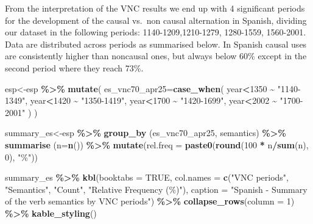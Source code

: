 \documentclass[
]{article}
\newenvironment{Shaded}{\begin{snugshade}}{\end{snugshade}}
\newcommand{\AttributeTok}[1]{\textcolor[rgb]{0.13,0.29,0.53}{#1}}
\newcommand{\ConstantTok}[1]{\textcolor[rgb]{0.56,0.35,0.01}{#1}}
\newcommand{\DecValTok}[1]{\textcolor[rgb]{0.00,0.00,0.81}{#1}}
\newcommand{\FunctionTok}[1]{\textcolor[rgb]{0.13,0.29,0.53}{\textbf{#1}}}
\newcommand{\NormalTok}[1]{#1}
\newcommand{\OtherTok}[1]{\textcolor[rgb]{0.56,0.35,0.01}{#1}}
\newcommand{\SpecialCharTok}[1]{\textcolor[rgb]{0.81,0.36,0.00}{\textbf{#1}}}
\newcommand{\StringTok}[1]{\textcolor[rgb]{0.31,0.60,0.02}{#1}}
\begin{document}
From the interpretation of the VNC results we end up with 4 significant
periods for the development of the causal vs.~non causal alternation in
Spanish, dividing our dataset in the following periods:
1140-1209,1210-1279, 1280-1559, 1560-2001. Data are distributed across
periods as summarised below. In Spanish causal uses are consistently
higher than noncausal ones, but always below 60\% except in the second
period where they reach 73\%.

\begin{Shaded}
\begin{Highlighting}[]
\NormalTok{esp}\OtherTok{\textless{}{-}}\NormalTok{esp }\SpecialCharTok{\%\textgreater{}\%} 
  \FunctionTok{mutate}\NormalTok{(}
    \AttributeTok{es\_vnc70\_apr25=}\FunctionTok{case\_when}\NormalTok{(}
\NormalTok{      year}\SpecialCharTok{\textless{}}\DecValTok{1350} \SpecialCharTok{\textasciitilde{}} \StringTok{"1140{-}1349"}\NormalTok{,}
\NormalTok{      year}\SpecialCharTok{\textless{}}\DecValTok{1420} \SpecialCharTok{\textasciitilde{}} \StringTok{"1350{-}1419"}\NormalTok{,}
\NormalTok{      year}\SpecialCharTok{\textless{}}\DecValTok{1700} \SpecialCharTok{\textasciitilde{}} \StringTok{"1420{-}1699"}\NormalTok{,}
\NormalTok{      year}\SpecialCharTok{\textless{}}\DecValTok{2002} \SpecialCharTok{\textasciitilde{}} \StringTok{"1700{-}2001"}
\NormalTok{    )}
\NormalTok{  )}

\NormalTok{summary\_es}\OtherTok{\textless{}{-}}\NormalTok{esp }\SpecialCharTok{\%\textgreater{}\%}
  \FunctionTok{group\_by}\NormalTok{ (es\_vnc70\_apr25, semantics) }\SpecialCharTok{\%\textgreater{}\%}
  \FunctionTok{summarise}\NormalTok{ (}\AttributeTok{n=}\FunctionTok{n}\NormalTok{()) }\SpecialCharTok{\%\textgreater{}\%}
  \FunctionTok{mutate}\NormalTok{(}\AttributeTok{rel.freq =} \FunctionTok{paste0}\NormalTok{(}\FunctionTok{round}\NormalTok{(}\DecValTok{100} \SpecialCharTok{*}\NormalTok{ n}\SpecialCharTok{/}\FunctionTok{sum}\NormalTok{(n), }\DecValTok{0}\NormalTok{), }\StringTok{"\%"}\NormalTok{))}

\NormalTok{summary\_es }\SpecialCharTok{\%\textgreater{}\%}  \FunctionTok{kbl}\NormalTok{(}\AttributeTok{booktabs =} \ConstantTok{TRUE}\NormalTok{, }\AttributeTok{col.names =} \FunctionTok{c}\NormalTok{(}\StringTok{"VNC periods"}\NormalTok{, }\StringTok{"Semantics"}\NormalTok{, }\StringTok{"Count"}\NormalTok{, }\StringTok{"Relative Frequency (\%)"}\NormalTok{), }\AttributeTok{caption =} \StringTok{"Spanish {-} Summary of the verb semantics by VNC periods"}\NormalTok{) }\SpecialCharTok{\%\textgreater{}\%}
   \FunctionTok{collapse\_rows}\NormalTok{(}\AttributeTok{column =} \DecValTok{1}\NormalTok{) }\SpecialCharTok{\%\textgreater{}\%} 
  \FunctionTok{kable\_styling}\NormalTok{() }
\end{Highlighting}
\end{Shaded}
\end{document}
